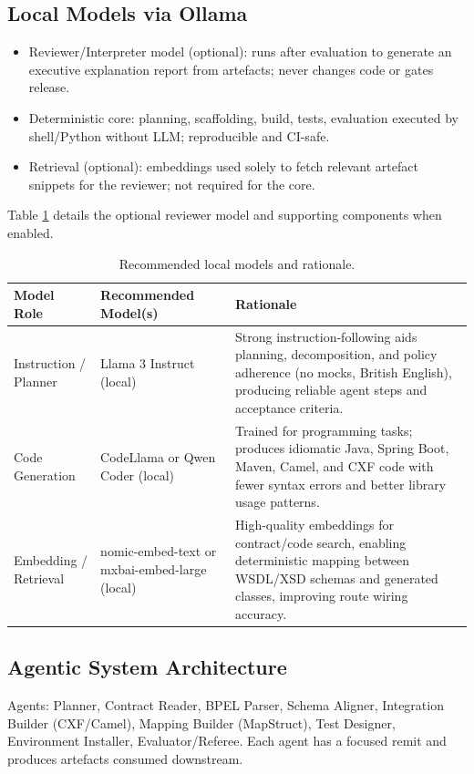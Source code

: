 \documentclass[11pt,a4paper]{article}
\begin{document}
\subsection{Local Models via Ollama}
\begin{itemize}
  \item Reviewer/Interpreter model (optional): runs after evaluation to generate an executive explanation report from artefacts; never changes code or gates release.
  \item Deterministic core: planning, scaffolding, build, tests, evaluation executed by shell/Python without LLM; reproducible and CI-safe.
  \item Retrieval (optional): embeddings used solely to fetch relevant artefact snippets for the reviewer; not required for the core.
\end{itemize}
Table \ref{tab:local-models} details the optional reviewer model and supporting components when enabled.
\renewcommand{\arraystretch}{1.2}
\begin{longtable}{|>{\raggedright\arraybackslash}p{3.2cm}|>{\raggedright\arraybackslash}p{6.0cm}|>{\raggedright\arraybackslash}p{6.0cm}|}
\caption{Recommended local models and rationale.}\label{tab:local-models}\\
\hline
\textbf{Model Role} & \textbf{Recommended Model(s)} & \textbf{Rationale} \\
\hline
Instruction / Planner & Llama 3 Instruct (local) & Strong instruction-following aids planning, decomposition, and policy adherence (no mocks, British English), producing reliable agent steps and acceptance criteria. \\
\hline
Code Generation & CodeLlama or Qwen Coder (local) & Trained for programming tasks; produces idiomatic Java, Spring Boot, Maven, Camel, and CXF code with fewer syntax errors and better library usage patterns. \\
\hline
Embedding / Retrieval & nomic-embed-text or mxbai-embed-large (local) & High-quality embeddings for contract/code search, enabling deterministic mapping between WSDL/XSD schemas and generated classes, improving route wiring accuracy. \\
\hline
\end{longtable}


\subsection{Agentic System Architecture}
Agents: Planner, Contract Reader, BPEL Parser, Schema Aligner, Integration Builder (CXF/Camel), Mapping Builder (MapStruct), Test Designer, Environment Installer, Evaluator/Referee. Each agent has a focused remit and produces artefacts consumed downstream.
\end{document}
